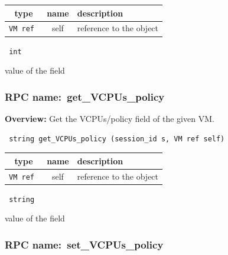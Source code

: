 
 
\vspace{0.3cm}
\begin{tabular}{|c|c|p{7cm}|}
 \hline
{\bf type} & {\bf name} & {\bf description} \\ \hline
{\tt VM ref } & self & reference to the object \\ \hline 

\end{tabular}

\vspace{0.3cm}

{\tt 
int
}


value of the field
\vspace{0.3cm}
\vspace{0.3cm}
\vspace{0.3cm}
\subsubsection{RPC name:~get\_VCPUs\_policy}

{\bf Overview:} 
Get the VCPUs/policy field of the given VM.

\begin{verbatim} string get_VCPUs_policy (session_id s, VM ref self)\end{verbatim}



 
\vspace{0.3cm}
\begin{tabular}{|c|c|p{7cm}|}
 \hline
{\bf type} & {\bf name} & {\bf description} \\ \hline
{\tt VM ref } & self & reference to the object \\ \hline 

\end{tabular}

\vspace{0.3cm}

{\tt 
string
}


value of the field
\vspace{0.3cm}
\vspace{0.3cm}
\vspace{0.3cm}
\subsubsection{RPC name:~set\_VCPUs\_policy}

